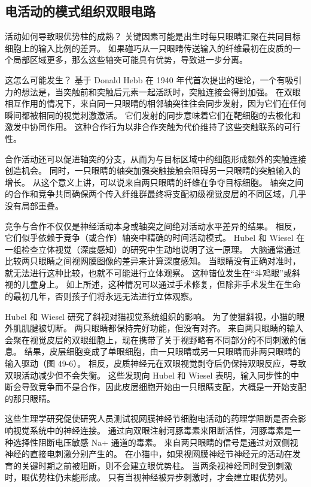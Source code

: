\subsection{电活动的模式组织双眼电路}
活动如何导致眼优势柱的成熟？ 关键因素可能是出生时每只眼睛汇聚在共同目标细胞上的输入比例的差异。 如果碰巧从一只眼睛传送输入的纤维最初在皮质的一个局部区域更多，那么这些轴突可能具有优势，导致进一步分离。

这怎么可能发生？ 基于 Donald Hebb 在 1940 年代首次提出的理论，一个有吸引力的想法是，当突触前和突触后元素一起活跃时，突触连接会得到加强。 在双眼相互作用的情况下，来自同一只眼睛的相邻轴突往往会同步发射，因为它们在任何瞬间都被相同的视觉刺激激活。 它们发射的同步意味着它们在靶细胞的去极化和激发中协同作用。 这种合作行为以非合作突触为代价维持了这些突触联系的可行性。

合作活动还可以促进轴突的分支，从而为与目标区域中的细胞形成额外的突触连接创造机会。 同时，一只眼睛的轴突加强突触接触会阻碍另一只眼睛的突触输入的增长。 从这个意义上讲，可以说来自两只眼睛的纤维在争夺目标细胞。 轴突之间的合作和竞争共同确保两个传入纤维群最终将支配初级视觉皮层的不同区域，几乎没有局部重叠。

竞争与合作不仅仅是神经活动本身或轴突之间绝对活动水平差异的结果。 相反，它们似乎依赖于竞争（或合作）轴突中精确的时间活动模式。 Hubel 和 Wiesel 在一组检查立体视觉（深度感知）的研究中生动地说明了这一原理。 大脑通常通过比较两只眼睛之间视网膜图像的差异来计算深度感知。 当眼睛没有正确对准时，就无法进行这种比较，也就不可能进行立体观察。 这种错位发生在“斗鸡眼”或斜视的儿童身上。 如上所述，这种情况可以通过手术修复，但除非手术发生在生命的最初几年，否则孩子们将永远无法进行立体观察。

Hubel 和 Wiesel 研究了斜视对猫视觉系统组织的影响。 为了使猫斜视，小猫的眼外肌肌腱被切断。 两只眼睛都保持完好功能，但没有对齐。 来自两只眼睛的输入会聚在视觉皮层的双眼细胞上，现在携带了关于视野略有不同部分的不同刺激的信息。 结果，皮层细胞变成了单眼细胞，由一只眼睛或另一只眼睛而非两只眼睛的输入驱动（图 49-6）。 相反，皮质神经元在双眼视觉剥夺后仍保持双眼反应，导致双眼活动减少但不会失衡。 这些发现向 Hubel 和 Wiesel 表明，输入同步性的中断会导致竞争而不是合作，因此皮层细胞开始由一只眼睛支配，大概是一开始支配的那只眼睛。

这些生理学研究促使研究人员测试视网膜神经节细胞电活动的药理学阻断是否会影响视觉系统中的神经连接。 通过向双眼注射河豚毒素来阻断活性，河豚毒素是一种选择性阻断电压敏感 Na+ 通道的毒素。 来自两只眼睛的信号是通过对双侧视神经的直接电刺激分别产生的。 在小猫中，如果视网膜神经节神经元的活动在发育的关键时期之前被阻断，则不会建立眼优势柱。 当两条视神经同时受到刺激时，眼优势柱仍未能形成。 只有当视神经被异步刺激时，才会建立眼优势列。

